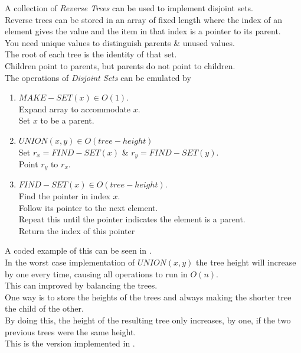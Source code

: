 \documentclass[11pt,a4paper]{article}
\begin{document}
A collection of \textit{Reverse Trees} can be used to implement disjoint sets.\\
Reverse trees can be stored in an array of fixed length where the index of an element gives the value and the item in that index is a pointer to its parent.\\
You need unique values to distinguish parents \& unused values.\\
The root of each tree is the identity of that set.\\
Children point to parents, but parents do not point to children.\\
The operations of \textit{Disjoint Sets} can be emulated by
\begin{enumerate}[label=\roman*)]
	\item $MAKE-SET(x)\in O(1)$.\\
	Expand array to accommodate $x$.\\
	Set $x$ to be a parent.
	\item $UNION(x,y)\in O(tree-height)$\\
	Set $r_x=FIND-SET(x)$ \& $r_y=FIND-SET(y)$.\\
	Point $r_y$ to $r_x$.
	\newpage
	\item $FIND-SET(x)\in O(tree-height)$.\\
	Find the pointer in index $x$.\\
	Follow its pointer to the next element.\\
	Repeat this until the pointer indicates the element is a parent.\\
	Return the index of this pointer
\end{enumerate}
\nb A coded example of this can be seen in {}.\\

In the worst case implementation of $UNION(x,y)$ the tree height will increase by one every time, causing all operations to run in $O(n)$.\\
This can improved by balancing the trees.\\
One way is to store the heights of the trees and always making the shorter tree the child of the other.\\
By doing this, the height of the resulting tree only increases, by one, if the two previous trees were the same height.\\
\nb This is the version implemented in {}.\\
\end{document}
